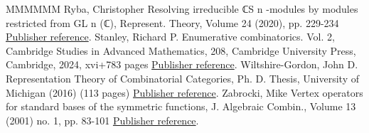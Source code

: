 \documentclass[11pt]{article}
\theoremstyle{definition}
\numberwithin{equation}{section}
\begin{document}
\begin{thebibliography}{MMMMMM}
 Ryba, Christopher Resolving irreducible ℂS n -modules by modules restricted from GL n (ℂ), Represent. Theory, Volume 24 (2020), pp. 229-234 \href{https://alco.centre-mersenne.org/articles/10.5802/alco.365/#MR4127906}{Publisher reference}.
 Stanley, Richard P. Enumerative combinatorics. Vol. 2, Cambridge Studies in Advanced Mathematics, 208, Cambridge University Press, Cambridge, 2024, xvi+783 pages \href{https://alco.centre-mersenne.org/articles/10.5802/alco.365/#MR4621625}{Publisher reference}.
 Wiltshire-Gordon, John D. Representation Theory of Combinatorial Categories, Ph. D. Thesis, University of Michigan (2016) (113 pages) \href{https://alco.centre-mersenne.org/articles/10.5802/alco.365/#MR3641124}{Publisher reference}.
 Zabrocki, Mike Vertex operators for standard bases of the symmetric functions, J. Algebraic Combin., Volume 13 (2001) no. 1, pp. 83-101 \href{https://alco.centre-mersenne.org/articles/10.5802/alco.365/#MR1817706}{Publisher reference}.
\end{thebibliography}
\end{document}
